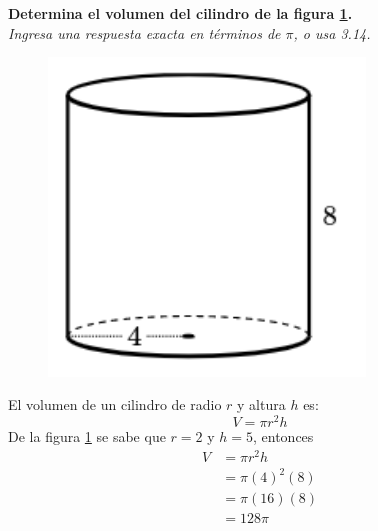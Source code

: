 \question[10] \textbf{Determina el volumen del cilindro de la figura \ref{fig:vol_cil_08}.}\\
\textit{Ingresa una respuesta exacta en términos de $\pi$, o usa 3.14.}

\begin{minipage}{0.3\linewidth}
    \begin{figure}[H]
        \begin{center}
            \includegraphics[width=0.75\textwidth]{../images/vol_cil_08.png}
        \end{center}
        \caption{}
        \label{fig:vol_cil_08}
    \end{figure}
\end{minipage}
\begin{minipage}{0.7\linewidth}
    \begin{solutionbox}{6cm}        El volumen de un cilindro de radio $r$ y altura $h$ es:
        \begin{equation*}
            V = \pi r^2 h
        \end{equation*}
        De la figura \ref{fig:vol_cil_08} se sabe que $r=2$ y $h=5$, entonces
        \begin{equation*}
            \begin{split}
                V & = \pi r^2 h\\
                & = \pi (4)^2 (8)\\
                & = \pi (16) (8)\\
                & = 128\pi
            \end{split}
        \end{equation*}
    \end{solutionbox}
\end{minipage}